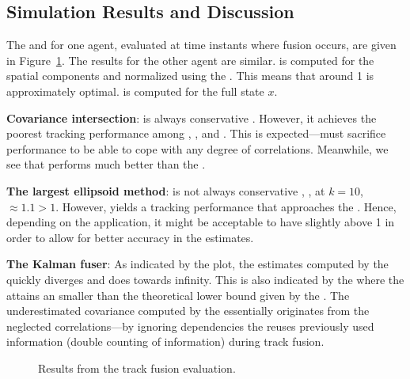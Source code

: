 \subsection{Simulation Results and Discussion}

The \abbrRMT and \abbrCOIN for one agent, evaluated at time instants where fusion occurs, are given in Figure~\ref{fig:track-fusion-evaluation:results}. The results for the other agent are similar. \abbrRMT is computed for the spatial components and normalized using the \abbrCRLB. This means that \abbrRMT around 1 is approximately optimal. \abbrCOIN is computed for the full state $x$. 

\textbf{Covariance intersection}: \abbrCI is always conservative \wrt \abbrCOIN. However, it achieves the poorest tracking performance among \abbrCI, \abbrLE, and \abbrNKF. This is expected---\abbrCI must sacrifice performance to be able to cope with any degree of correlations. Meanwhile, we see that \abbrCI performs much better than the \abbrLKF.

\textbf{The largest ellipsoid method}: \abbrLE is not always conservative \wrt, \eg, at $k=10$, \abbrCOIN$\approx1.1>1$. However, \abbrLE yields a tracking performance that approaches the \abbrCRLB. Hence, depending on the application, it might be acceptable to have \abbrCOIN slightly above 1 in order to allow for better accuracy in the estimates.

\textbf{The \naive Kalman fuser}: As indicated by the \abbrCOIN plot, the estimates computed by the \abbrNKF quickly diverges and does towards infinity. This is also indicated by the \abbrRMT where the \abbrNKF attains an \abbrRMT smaller than the theoretical lower bound given by the \abbrCRLB. The underestimated covariance computed by the \abbrNKF essentially originates from the neglected correlations---by ignoring dependencies the \abbrNKF reuses previously used information (double counting of information) during track fusion.



\begin{figure}[tb]
	\centering
	\begin{tikzpicture}[xscale=.3,yscale=1.5]
		
	\end{tikzpicture}
	\caption{Results from the track fusion evaluation.}
	\label{fig:track-fusion-evaluation:results}
\end{figure}






